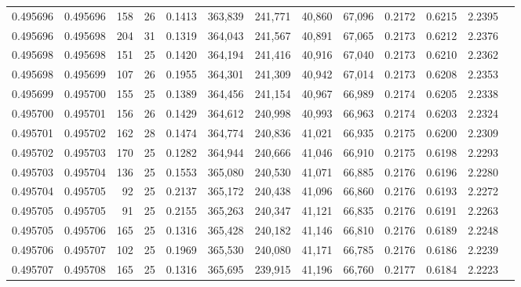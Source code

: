 \begin{tabular}{rrrrrrrrrrrrr}
0.495696 & 0.495696 & 158 &  26 &                                     0.1413 & 363,839 & 241,771 &  40,860 &  67,096 & 0.2172 & 0.6215 & 2.2395 \\
0.495696 & 0.495698 & 204 &  31 &                                     0.1319 & 364,043 & 241,567 &  40,891 &  67,065 & 0.2173 & 0.6212 & 2.2376 \\
0.495698 & 0.495698 & 151 &  25 &                                     0.1420 & 364,194 & 241,416 &  40,916 &  67,040 & 0.2173 & 0.6210 & 2.2362 \\
0.495698 & 0.495699 & 107 &  26 &                                     0.1955 & 364,301 & 241,309 &  40,942 &  67,014 & 0.2173 & 0.6208 & 2.2353 \\
0.495699 & 0.495700 & 155 &  25 &                                     0.1389 & 364,456 & 241,154 &  40,967 &  66,989 & 0.2174 & 0.6205 & 2.2338 \\
0.495700 & 0.495701 & 156 &  26 &                                     0.1429 & 364,612 & 240,998 &  40,993 &  66,963 & 0.2174 & 0.6203 & 2.2324 \\
0.495701 & 0.495702 & 162 &  28 &                                     0.1474 & 364,774 & 240,836 &  41,021 &  66,935 & 0.2175 & 0.6200 & 2.2309 \\
0.495702 & 0.495703 & 170 &  25 &                                     0.1282 & 364,944 & 240,666 &  41,046 &  66,910 & 0.2175 & 0.6198 & 2.2293 \\
0.495703 & 0.495704 & 136 &  25 &                                     0.1553 & 365,080 & 240,530 &  41,071 &  66,885 & 0.2176 & 0.6196 & 2.2280 \\
0.495704 & 0.495705 &  92 &  25 &                                     0.2137 & 365,172 & 240,438 &  41,096 &  66,860 & 0.2176 & 0.6193 & 2.2272 \\
0.495705 & 0.495705 &  91 &  25 &                                     0.2155 & 365,263 & 240,347 &  41,121 &  66,835 & 0.2176 & 0.6191 & 2.2263 \\
0.495705 & 0.495706 & 165 &  25 &                                     0.1316 & 365,428 & 240,182 &  41,146 &  66,810 & 0.2176 & 0.6189 & 2.2248 \\
0.495706 & 0.495707 & 102 &  25 &                                     0.1969 & 365,530 & 240,080 &  41,171 &  66,785 & 0.2176 & 0.6186 & 2.2239 \\
0.495707 & 0.495708 & 165 &  25 &                                     0.1316 & 365,695 & 239,915 &  41,196 &  66,760 & 0.2177 & 0.6184 & 2.2223 \\

\end{tabular}
